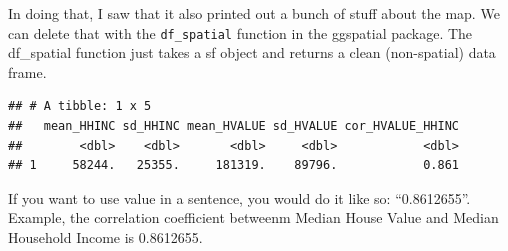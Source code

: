 \documentclass[]{article}
\newenvironment{Shaded}{\begin{snugshade}}{\end{snugshade}}
\newcommand{\CommentTok}[1]{\textcolor[rgb]{0.56,0.35,0.01}{\textit{#1}}}
\newcommand{\DataTypeTok}[1]{\textcolor[rgb]{0.13,0.29,0.53}{#1}}
\newcommand{\KeywordTok}[1]{\textcolor[rgb]{0.13,0.29,0.53}{\textbf{#1}}}
\newcommand{\NormalTok}[1]{#1}
\newcommand{\OperatorTok}[1]{\textcolor[rgb]{0.81,0.36,0.00}{\textbf{#1}}}
\newcommand{\OtherTok}[1]{\textcolor[rgb]{0.56,0.35,0.01}{#1}}
\newcommand{\StringTok}[1]{\textcolor[rgb]{0.31,0.60,0.02}{#1}}
\begin{document}
In doing that, I saw that it also printed out a bunch of stuff about the
map. We can delete that with the \texttt{df\_spatial} function in the
ggspatial package. The df\_spatial function just takes a sf object and
returns a clean (non-spatial) data frame.

\begin{Shaded}
\end{Shaded}

\begin{verbatim}
## # A tibble: 1 x 5
##   mean_HHINC sd_HHINC mean_HVALUE sd_HVALUE cor_HVALUE_HHINC
##        <dbl>    <dbl>       <dbl>     <dbl>            <dbl>
## 1     58244.   25355.     181319.    89796.            0.861
\end{verbatim}

If you want to use value in a sentence, you would do it like so:
``0.8612655''. Example, the correlation coefficient betweenm Median
House Value and Median Household Income is 0.8612655.
\end{document}
